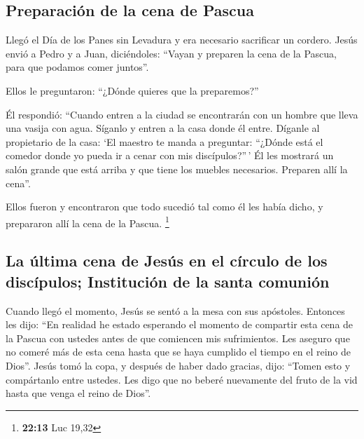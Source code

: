 \hypertarget{preparaciuxf3n-de-la-cena-de-pascua}{%
\subsection{Preparación de la cena de
Pascua}\label{preparaciuxf3n-de-la-cena-de-pascua}}

 Llegó el Día de los Panes sin Levadura y era necesario
sacrificar un cordero.  Jesús envió a Pedro y a Juan,
diciéndoles: ``Vayan y preparen la cena de la Pascua, para que podamos
comer juntos''.

 Ellos le preguntaron: ``¿Dónde quieres que la
preparemos?''

 Él respondió: ``Cuando entren a la ciudad se encontrarán
con un hombre que lleva una vasija con agua. Síganlo y entren a la casa
donde él entre.  Díganle al propietario de la casa: `El
maestro te manda a preguntar: ``¿Dónde está el comedor donde yo pueda ir
a cenar con mis discípulos?''\,'  Él les mostrará un
salón grande que está arriba y que tiene los muebles necesarios.
Preparen allí la cena''.

 Ellos fueron y encontraron que todo sucedió tal como él
les había dicho, y prepararon allí la cena de la Pascua. \footnote{\textbf{22:13}
  Luc 19,32}

\hypertarget{la-uxfaltima-cena-de-jesuxfas-en-el-cuxedrculo-de-los-discuxedpulos-instituciuxf3n-de-la-santa-comuniuxf3n}{%
\subsection{La última cena de Jesús en el círculo de los discípulos;
Institución de la santa
comunión}\label{la-uxfaltima-cena-de-jesuxfas-en-el-cuxedrculo-de-los-discuxedpulos-instituciuxf3n-de-la-santa-comuniuxf3n}}

 Cuando llegó el momento, Jesús se sentó a la mesa con
sus apóstoles. Entonces les dijo:  ``En realidad he
estado esperando el momento de compartir esta cena de la Pascua con
ustedes antes de que comiencen mis sufrimientos.  Les
aseguro que no comeré más de esta cena hasta que se haya cumplido el
tiempo en el reino de Dios''.  Jesús tomó la copa, y
después de haber dado gracias, dijo: ``Tomen esto y compártanlo entre
ustedes.  Les digo que no beberé nuevamente del fruto de
la vid hasta que venga el reino de Dios''.

